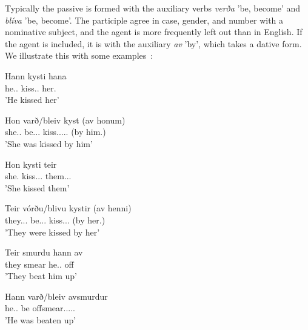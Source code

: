 \documentclass[12pt,%
]{lin-v2/lin}
\begin{document}
Typically the passive is formed with the auxiliary verbs \emph{verða} 'be, become' and \emph{blíva} 'be, become'. 
The participle agree in case, gender, and number with a nominative subject, and the agent is more frequently left
out than in English. If the agent is included, it is with the auxiliary \emph{av} 'by', which takes a dative form.
We illustrate this with some examples~\citep[69]{faroese}:
\begin{exe}
    \ex
    \begin{xlist}
        \item \gll Hann kysti hana\\
        he.\Third\Sg.\Nom{} kiss.\Sg.\Pst{} her.\Third\Sg\Acc\\
        \trans 'He kissed her'
        \item \gll Hon varð/bleiv kyst (av honum)\\
        she.\Third\Sg.\Nom{} be.\Sg.\Pst.\Aux{} kiss.\Nom.\Sg.\F.\Pst.\Ptcp{} (by him.\Dat)\\
        \trans 'She was kissed by him'
    \end{xlist}
    \ex
    \begin{xlist}
        \item \gll Hon kysti teir\\
        she.\Third\Sg\Nom{} kiss.\Sg.\Pst.\Ind{} them.\Acc.\Pl.\M{}\\
        \trans 'She kissed them'
        \item \gll Teir vórðu/blivu kystir (av henni)\\
        they.\Third\Pl.\Nom.\M{} be.\Pl.\Pst.\Aux{} kiss.\Nom.\Pl.\M{} (by her.\Dat)\\
        \trans 'They were kissed by her'
    \end{xlist}
    \ex
    \begin{xlist}
        \item \gll Teir smurdu hann av\\
        they smear he.\Third\Sg.\Acc{} off\\
        \trans 'They beat him up'
        \item \gll Hann varð/bleiv avsmurdur\\
        he.\Third\Sg.\Nom{} be offsmear.\Nom.\Sg.\M.\Pst.\Ptcp\\
        \trans 'He was beaten up'
    \end{xlist}
\end{exe}
\end{document}
